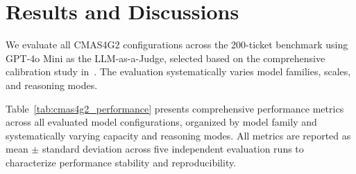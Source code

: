 \documentclass[runningheads]{llncs}
\begin{document}
\section{Results and Discussions}
\label{sec:results}
We evaluate all CMAS4G2 configurations across the 200-ticket benchmark using GPT-4o Mini as the LLM-as-a-Judge, selected based on the comprehensive calibration study in~\cite{huang2025laj}. The evaluation systematically varies model families, scales, and reasoning modes.

Table~\ref{tab:cmas4g2_performance} presents comprehensive performance metrics across all evaluated model configurations, organized by model family and systematically varying capacity and reasoning modes. All metrics are reported as mean $\pm$ standard deviation across five independent evaluation runs to characterize performance stability and reproducibility.
\end{document}

